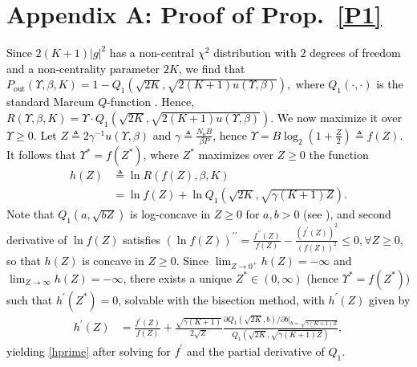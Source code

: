 \documentclass[10pt, twocolumn]{IEEEtran}
\theoremstyle{plain}
\theoremstyle{definition}
\theoremstyle{remark}
\newcommand\hlt[1]{\textcolor{black}{#1}}
\begin{document}
{\begin{appendices}\label{S8}
\section*{Appendix A: Proof of Prop.~\ref{P1}}\label{X1}
\hlt{Since $2(K{+}1)|g|^{2}$ has a non-central $\chi^{2}$ distribution with $2$ degrees of freedom and a non-centrality parameter $2K$, we find that $P_{\mathrm{out}}(\Upsilon,\beta,K){=}1{-}Q_{1}(\sqrt{2K},\sqrt{2(K{+}1)u(\Upsilon,\beta)}),$ where $Q_{1}(\cdot,\cdot)$ is the standard Marcum $Q$-function \cite{Rician}. Hence,
$
	R(\Upsilon,\beta,K) = \Upsilon\cdot Q_{1}(\sqrt{2K},\sqrt{2(K + 1)u(\Upsilon,\beta)}).
$
We now maximize it over  $\Upsilon{\geq}0$. Let $Z{\triangleq}2\gamma^{-1}u\left(\Upsilon,\beta\right)$ and $\gamma{\triangleq}\frac{N_{0}B}{\beta P}$, hence $\Upsilon{=}B\log_{2}\left(1{+}\frac{Z}{2}\right){\triangleq}f(Z)$. It follows that $\Upsilon^{*}{=}f\left(Z^{*}\right)$, where $Z^{*}$ maximizes over $Z{\geq}0$ the function
\begin{align}\label{eq:Pout_defn}
    h(Z) &\triangleq \ln R(f(Z),\beta,K) \\&= \ln f(Z) + \ln Q_1 (\sqrt{2K}, \sqrt{\gamma(K + 1)Z}).
\end{align}
Note that $Q_{1}\left(a,\sqrt{bZ}\right)$ is log-concave in $Z{\geq}0$ for $a,b{>}0$ (see \cite{MarcumTB}), and second derivative of $\ln f(Z)$ satisfies $(\ln f(Z))^{\prime\prime}{=}\frac{f^{\prime\prime}(Z)}{f(Z)}{-}\frac{(f^{\prime}(Z))^{2}}{(f(Z))^2}{\leq}0,{\forall}Z{\geq}0$, so that $h(Z)$ is concave in $Z{\geq}0$. Since $\lim_{Z{\to}0^{+}}h(Z){=}-\infty$ and $\lim_{Z{\to}\infty}h(Z){=}-\infty$, there exists a unique $Z^{*}{\in}(0,\infty)$ (hence $\Upsilon^{*}{=}f\left(Z^{*}\right)$) such that $h^{\prime}(Z^{*}){=}0$, solvable with the bisection method, with $h^{\prime}(Z)$ given by
\begin{align}
    \nonumber
    h^\prime(Z) &= \frac{f^\prime(Z)}{f(Z)} + \frac{\sqrt{\gamma(K + 1)}}{2\sqrt{Z}}\frac{\partial Q_1(\sqrt{2K},b)/\partial b\big|_{b=\sqrt{\gamma(K + 1)Z}}}{Q_1(\sqrt{2K},\sqrt{\gamma(K + 1)Z})},
\end{align}
yielding \eqref{hprime} after solving for $f^{\prime}$ and the partial derivative of $Q_{1}$.}
\vspace{-4mm}


\end{appendices}}
\end{document}
